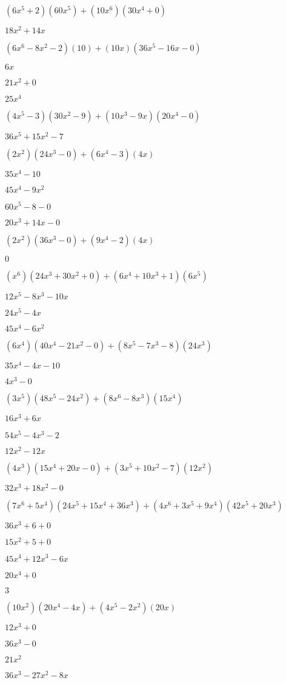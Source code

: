\documentclass{article}
\begin{document}
\begin{multicols}{2}
$(6x^{5}+2)(60x^{5})+(10x^{6})(30x^{4}+0)$\item $18x^{2}+14x$\item $(6x^{6}-8x^2-2)(10)+(10x)(36x^{5}-16x-0)$\item $6x$\item $21x^{2}+0$\item $25x^{4}$\item $(4x^{5}-3)(30x^{2}-9)+(10x^{3}-9x)(20x^{4}-0)$\item $36x^{5}+15x^{2}-7$\item $(2x^2)(24x^{3}-0)+(6x^{4}-3)(4x)$\item $35x^{4}-10$\item $45x^{4}-9x^{2}$\item $60x^{5}-8-0$\item $20x^{3}+14x-0$\item $(2x^2)(36x^{3}-0)+(9x^{4}-2)(4x)$\item $0$\item $(x^{6})(24x^{3}+30x^{2}+0)+(6x^{4}+10x^{3}+1)(6x^{5})$\item $12x^{5}-8x^{3}-10x$\item $24x^{5}-4x$\item $45x^{4}-6x^{2}$\item $(6x^{4})(40x^{4}-21x^{2}-0)+(8x^{5}-7x^{3}-8)(24x^{3})$\item $35x^{4}-4x-10$\item $4x^{3}-0$\item $(3x^{5})(48x^{5}-24x^{2})+(8x^{6}-8x^{3})(15x^{4})$\item $16x^{3}+6x$\item $54x^{5}-4x^{3}-2$\item $12x^{2}-12x$\item $(4x^{3})(15x^{4}+20x-0)+(3x^{5}+10x^2-7)(12x^{2})$\item $32x^{3}+18x^{2}-0$\item $(7x^{6}+5x^{4})(24x^{5}+15x^{4}+36x^{3})+(4x^{6}+3x^{5}+9x^{4})(42x^{5}+20x^{3})$\item $36x^{3}+6+0$\item $15x^{2}+5+0$\item $45x^{4}+12x^{3}-6x$\item $20x^{4}+0$\item $3$\item $(10x^2)(20x^{4}-4x)+(4x^{5}-2x^2)(20x)$\item $12x^{3}+0$\item $36x^{3}-0$\item $21x^{2}$\item $36x^{3}-27x^{2}-8x$\item 
\end{multicols}
\end{document}
